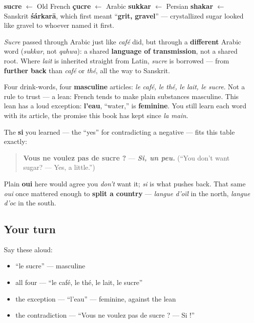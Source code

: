 \begin{cousinweb}
\textbf{sucre} $\leftarrow$ Old French \textbf{çucre} $\leftarrow$ Arabic \textbf{sukkar} $\leftarrow$ Persian \textbf{shakar} $\leftarrow$ Sanskrit \textbf{śárkarā}, which first meant \textquotedblleft{}\textbf{grit, gravel}\textquotedblright{} — crystallized sugar looked like gravel to whoever named it first.

\emph{Sucre} passed through Arabic just like \emph{café} did, but through a \textbf{different} Arabic word (\emph{sukkar}, not \emph{qahwa}): a shared \textbf{language of transmission}, not a shared root. Where \emph{lait} is inherited straight from Latin, \emph{sucre} is borrowed — from \textbf{further back} than \emph{café} or \emph{thé}, all the way to Sanskrit.
\end{cousinweb}

\begin{grammarlens}[title={Grammar Lens: a lean, and its one loud exception}]
Four drink-words, four \textbf{masculine} articles: \emph{le café, le thé, le lait, le sucre}. Not a rule to trust — a lean: French tends to make plain substances masculine. This lean has a loud exception: \textbf{l'eau}, \textquotedblleft{}water,\textquotedblright{} is \textbf{feminine}. You still learn each word with its article, the promise this book has kept since \emph{la main}.
\end{grammarlens}

\begin{culture}
The \textbf{si} you learned — the \textquotedblleft{}yes\textquotedblright{} for contradicting a negative — fits this table exactly:

\begin{quote}
\textbf{Vous ne voulez pas de sucre ?} — \emph{\textbf{Si, un peu.}} (\textquotedblleft{}You don't want sugar? — Yes, a little.\textquotedblright{})
\end{quote}

Plain \textbf{oui} here would agree you \emph{don't} want it; \emph{si} is what pushes back. That same \emph{oui} once mattered enough to \textbf{split a country} — \emph{langue d'oïl} in the north, \emph{langue d'oc} in the south.
\end{culture}

\subsection*{Your turn}
Say these aloud:

\begin{itemize}
\raggedright
  \item \textquotedblleft{}le sucre\textquotedblright{} — masculine
  \item all four — \textquotedblleft{}le café, le thé, le lait, le sucre\textquotedblright{}
  \item the exception — \textquotedblleft{}l'eau\textquotedblright{} — feminine, against the lean
  \item the contradiction — \textquotedblleft{}Vous ne voulez pas de sucre ? — Si !\textquotedblright{}
\end{itemize}

